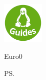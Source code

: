 \documentclass[a4paper]{scrlttr2}
\begin{document}
	\begin{letter}{\adressOne \\ 
	\customerStreet \\ \customerZIP \ \customerCity}
	
			\includegraphics[width=0.15\textwidth]{logo.png}			
			\opening{\invoiceSalutation}
			\invoiceText
		    \begin{invoice}{Euro}{0}
			    
		    \end{invoice}
		\ps \invoiceHint
		
		\renewcommand*{\raggedsignature}{\raggedright} 
		\closing{\invoiceClosing}
		\invoiceEnclosures



	\end{letter}
\end{document}
